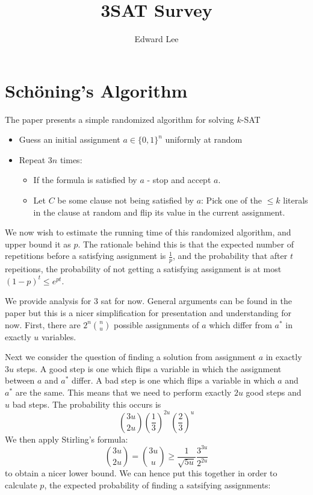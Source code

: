 \documentclass[12pt, a4paper]{article}
\title{3SAT Survey}
\author{Edward Lee}
\theoremstyle{definition}
\begin{document}
\maketitle

\section{Sch\"{o}ning's Algorithm}


The paper \cite{SchoningA99} presents a simple randomized algorithm for solving $k$-SAT

\begin{itemize}
	\item Guess an initial assignment $a \in \{0,1\}^n$ uniformly at random
	\item Repeat $3n$ times: 
	\begin{itemize}
		\item If the formula is satisfied by $a$ - stop and accept $a$.
		\item Let $C$ be some clause not being satisfied by $a$: Pick one of the $\leq k$ literals in the clause at random and flip its value in the current assignment.
	\end{itemize}
\end{itemize}

We now wish to estimate the running time of this randomized algorithm, and upper bound it as $p$. The rationale behind this is that the expected number of repetitions before a satisfying assignment is $\frac{1}{p}$, and the probability that after $t$ repeitions, the probability of not getting a satisfying assignment is at most $(1-p)^t \leq e^{pt}$.

We provide analysis for 3 sat for now. General arguments can be found in the paper but this is a nicer simplification for presentation and understanding for now. First, there are $2^n \binom{n}{u}$ possible assignments of $a$ which differ from $a^*$ in exactly $u$ variables.

Next we consider the question of finding a solution from assignment $a$ in exactly $3u$ steps. 
A good step is one which flips a variable in which the assignment between $a$ and $a^*$ differ. A bad step is one which flips a variable in which $a$ and $a^*$ are the same. This means that we need to perform exactly $2u$ good steps and $u$ bad steps. The probability this occurs is
\[
	\binom{3u}{2u} \left(\frac{1}{3}\right)^{2u} \left( \frac{2}{3}\right)^{u}
\]
We then apply Stirling's formula:
\[
	\binom{3u}{2u} = \binom{3u}{u} \geq \frac{1}{\sqrt{5u}} \frac{3^{3u}}{2^{2u}}
\]
to obtain a nicer lower bound. We can hence put this together in order to calculate $p$, the expected probability of finding a satsifying assignments:
\end{document}
